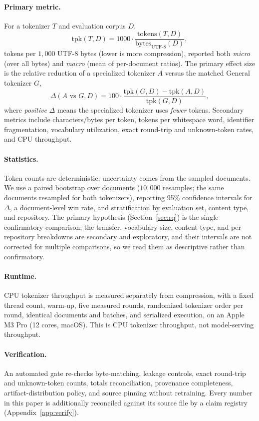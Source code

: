 \paragraph{Primary metric.} For a tokenizer $T$ and evaluation corpus $D$,
\begin{equation}
\mathrm{tpk}(T, D) = 1000 \cdot \frac{\mathrm{tokens}(T, D)}{\mathrm{bytes}_{\text{UTF-8}}(D)},
\end{equation}
tokens per $1{,}000$ UTF-8 bytes (lower is more compression), reported both
\emph{micro} (over all bytes) and \emph{macro} (mean of per-document ratios).
The primary effect size is the relative reduction of a specialized tokenizer $A$
versus the matched General tokenizer $G$,
\begin{equation}
\Delta(A \text{ vs } G, D) = 100 \cdot \frac{\mathrm{tpk}(G, D) - \mathrm{tpk}(A, D)}{\mathrm{tpk}(G, D)},
\end{equation}
where \emph{positive} $\Delta$ means the specialized tokenizer uses \emph{fewer}
tokens. Secondary metrics include characters/bytes per token, tokens per
whitespace word, identifier fragmentation, vocabulary utilization, exact
round-trip and unknown-token rates, and CPU throughput.

\paragraph{Statistics.} Token counts are deterministic; uncertainty comes from the
sampled documents. We use a paired bootstrap over documents ($10{,}000$ resamples;
the same documents resampled for both tokenizers), reporting 95\% confidence
intervals for $\Delta$, a document-level win rate, and stratification by
evaluation set, content type, and repository. The primary hypothesis
(Section~\ref{sec:rq}) is the single confirmatory comparison; the transfer,
vocabulary-size, content-type, and per-repository breakdowns are secondary and
exploratory, and their intervals are not corrected for multiple comparisons, so we
read them as descriptive rather than confirmatory.

\paragraph{Runtime.} CPU tokenizer throughput is measured separately from
compression, with a fixed thread count, warm-up, five measured rounds, randomized
tokenizer order per round, identical documents and batches, and serialized
execution, on an Apple M3 Pro (12 cores, macOS). This is CPU tokenizer throughput,
not model-serving throughput.

\paragraph{Verification.} An automated gate re-checks byte-matching, leakage
controls, exact round-trip and unknown-token counts, totals reconciliation,
provenance completeness, artifact-distribution policy, and source pinning without
retraining. Every number in this paper is additionally reconciled against its
source file by a claim registry (Appendix~\ref{app:verify}).
